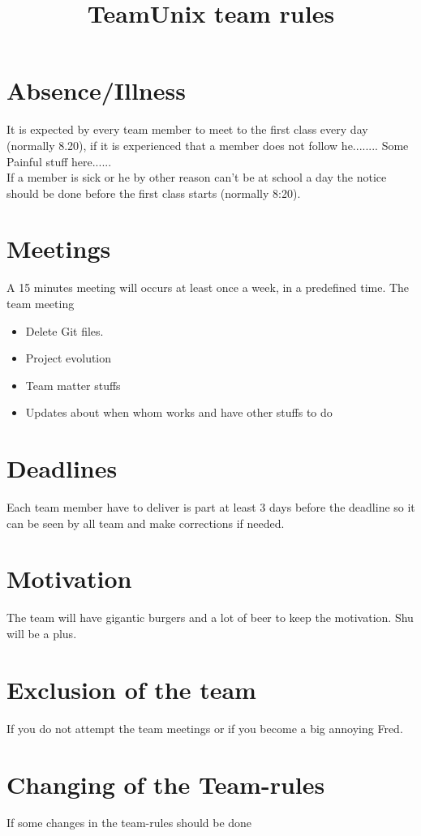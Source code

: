\documentclass[10pt,a4paper]{article}
\title{TeamUnix team rules}
\begin{document}
\maketitle

\section{Absence/Illness}
It is expected by every team member to meet to the first class every day (normally 8.20), if it is experienced that a member does not follow he........ Some Painful stuff here......
	\\If a member is sick or he by other reason can't be at school a day the notice should be done before the first class starts (normally 8:20).
\section{Meetings}
A 15 minutes meeting will occurs at least once a week, in a predefined time. The team meeting 
\begin{itemize}
	\item	 Delete Git files.
	\item  Project evolution
	\item Team matter stuffs
	\item Updates about when whom works and have other stuffs to do
\end{itemize}
\section{Deadlines}
Each team member have to deliver is part at least 3 days before the deadline so it can be seen by all team and make corrections if needed.
\section{Motivation}
The team will have gigantic burgers and a lot of beer to keep the motivation. Shu will be a plus.
\section{Exclusion of the team}
If you do not attempt the team meetings or if you become a big annoying Fred.
\section{Changing of the Team-rules}
If some changes in the team-rules should be done
\end{document}

